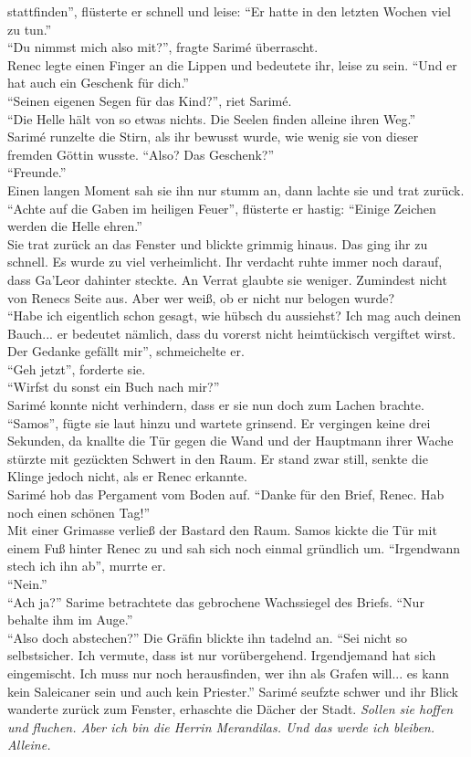 stattfinden'', flüsterte er schnell und leise: ``Er hatte in den letzten Wochen viel zu tun.''\\
``Du nimmst mich also mit?'', fragte Sarimé überrascht.\\
Renec legte einen Finger an die Lippen und bedeutete ihr, leise zu sein. ``Und er hat auch ein 
Geschenk für dich.''\\
``Seinen eigenen Segen für das Kind?'', riet Sarimé.\\
``Die Helle hält von so etwas nichts. Die Seelen finden alleine ihren Weg.''\\
Sarimé runzelte die Stirn, als ihr bewusst wurde, wie wenig sie von dieser fremden Göttin wusste. 
``Also? Das Geschenk?''\\
``Freunde.''\\
Einen langen Moment sah sie ihn nur stumm an, dann lachte sie und trat zurück.\\
``Achte auf die Gaben im heiligen Feuer'', flüsterte er hastig: ``Einige Zeichen werden die Helle 
ehren.''\\
Sie trat zurück an das Fenster und blickte grimmig hinaus. Das ging ihr zu schnell. Es wurde zu 
viel verheimlicht. Ihr verdacht ruhte immer noch darauf, dass Ga'Leor dahinter steckte. An Verrat 
glaubte sie weniger. Zumindest nicht von Renecs Seite aus. Aber wer weiß, ob er nicht nur belogen 
wurde?\\
``Habe ich eigentlich schon gesagt, wie hübsch du aussiehst? Ich mag auch deinen Bauch... er 
bedeutet nämlich, dass du vorerst nicht heimtückisch vergiftet wirst. Der Gedanke gefällt mir'', 
schmeichelte er.\\
``Geh jetzt'', forderte sie.\\
``Wirfst du sonst ein Buch nach mir?''\\
Sarimé konnte nicht verhindern, dass er sie nun doch zum Lachen brachte. ``Samos'', fügte sie laut 
hinzu und wartete grinsend. Er vergingen keine drei Sekunden, da knallte die Tür gegen die Wand und 
der Hauptmann ihrer Wache stürzte mit gezückten Schwert in den Raum. Er stand zwar still, senkte die 
Klinge jedoch nicht, als er Renec erkannte.\\
Sarimé hob das Pergament vom Boden auf. ``Danke für den Brief, Renec. Hab noch einen schönen 
Tag!''\\
Mit einer Grimasse verließ der Bastard den Raum. Samos kickte die Tür mit einem Fuß hinter Renec zu 
und sah sich noch einmal gründlich um. 
``Irgendwann stech ich ihn ab'', murrte er.\\
``Nein.''\\
``Ach ja?''
Sarime betrachtete das gebrochene Wachssiegel des Briefs. ``Nur behalte ihm im Auge.''\\
``Also doch abstechen?''
Die Gräfin blickte ihn tadelnd an. ``Sei nicht so selbstsicher. Ich vermute, dass ist nur 
vorübergehend. Irgendjemand hat sich eingemischt.  Ich muss nur noch herausfinden, wer ihn als 
Grafen will... es kann kein Saleicaner sein und auch kein Priester.'' Sarimé seufzte schwer und ihr 
Blick wanderte zurück zum Fenster, erhaschte die Dächer der Stadt. \textit{Sollen sie hoffen und 
fluchen. Aber ich bin die Herrin Merandilas. Und das werde ich bleiben. Alleine.}

